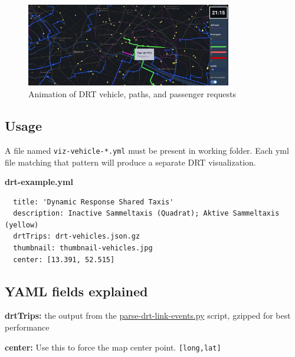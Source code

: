 \begin{figure}[H]
  \centering
  \includegraphics[width=0.8\textwidth]{assets/drt.jpg}
  \caption{Animation of DRT vehicle, paths, and passenger requests}
\end{figure}

\hypertarget{usage}{%
\subsection{Usage}}

A file named \texttt{viz-vehicle-*.yml} must be present in working
folder. Each yml file matching that pattern will produce a separate DRT
visualization.

\textbf{drt-example.yml}

\begin{lstlisting}
  title: 'Dynamic Response Shared Taxis'
  description: Inactive Sammeltaxis (Quadrat); Aktive Sammeltaxis (yellow)
  drtTrips: drt-vehicles.json.gz
  thumbnail: thumbnail-vehicles.jpg
  center: [13.391, 52.515]
\end{lstlisting}

\hypertarget{yaml-fields-explained}{%
\subsection{YAML fields explained}\label{yaml-fields-explained}}

\textbf{drtTrips:} the output from the
\href{https://github.com/simwrapper/simwrapper/raw/master/scripts/parse-drt-link-events.py}{parse-drt-link-events.py}
script, gzipped for best performance

\textbf{center:} Use this to force the map center point.
\texttt{{[}long,lat{]}}
